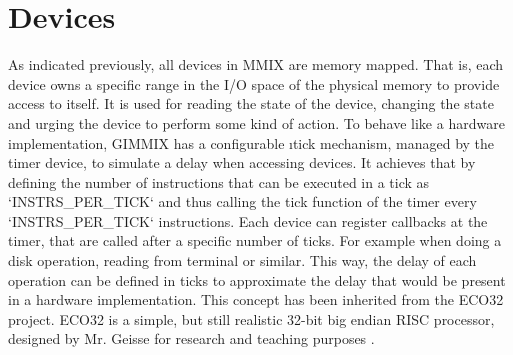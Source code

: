 \section{Devices}

As indicated previously, all devices in MMIX are memory mapped. That is, each device owns a specific range in the I/O space of the physical memory to provide access to itself. It is used for reading the state of the device, changing the state and urging the device to perform some kind of action. To behave like a hardware implementation, GIMMIX has a configurable \i{tick mechanism}, managed by the timer device, to simulate a delay when accessing devices. It achieves that by defining the number of instructions that can be executed in a tick as `INSTRS_PER_TICK` and thus calling the tick function of the timer every `INSTRS_PER_TICK` instructions. Each device can register callbacks at the timer, that are called after a specific number of ticks. For example when doing a disk operation, reading from terminal or similar. This way, the delay of each operation can be defined in ticks to approximate the delay that would be present in a hardware implementation. This concept has been inherited from the ECO32 project. ECO32 is a simple, but still realistic 32-bit big endian \gls{RISC} processor, designed by Mr. Geisse for research and teaching purposes \citep{eco32}.

